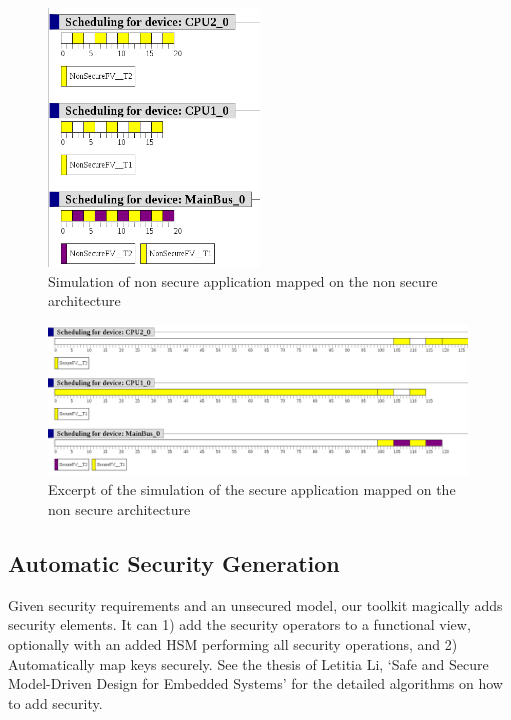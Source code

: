 \documentclass[12pt]{article}
\begin{document}
\begin{figure}[htbp]
\centering
\includegraphics[width=0.5\textwidth]{fig/simu_mapping1}
\caption{Simulation of non secure application mapped on the non secure architecture} \label{fig:simu_mapping1}
\end{figure}

\begin{figure}[htbp]
\centering
\includegraphics[width=0.99\textwidth]{fig/simu_mapping3}
\caption{Excerpt of the simulation of the secure application mapped on the non secure architecture} \label{fig:simu_mapping3}
\end{figure}

\subsection{Automatic Security Generation}

Given security requirements and an unsecured model, our toolkit magically adds security elements. It can 1) add the security operators to a functional view, optionally with an added HSM performing all security operations, and 2) Automatically map keys securely. See the thesis of Letitia Li, `Safe and Secure Model-Driven Design for Embedded Systems' for the detailed algorithms on how to add security.
\end{document}
